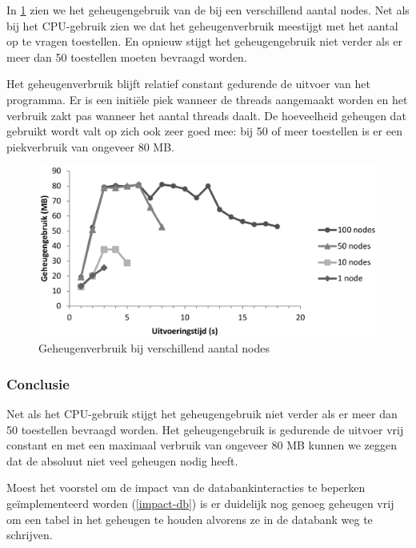 In \cref{fig-ram-aantalnodes} zien we het geheugengebruik van de \nwmretriever{} bij een verschillend aantal nodes.
Net als bij het CPU-gebruik zien we dat het geheugenverbruik meestijgt met het aantal op te vragen toestellen.
En opnieuw stijgt het geheugengebruik niet verder als er meer dan 50 toestellen moeten bevraagd worden.

Het geheugenverbruik blijft relatief constant gedurende de uitvoer van het programma.
Er is een initiële piek wanneer de threads aangemaakt worden en het verbruik zakt pas wanneer het aantal threads daalt.
De hoeveelheid geheugen dat gebruikt wordt valt op zich ook zeer goed mee: bij 50 of meer toestellen is er een piekverbruik van ongeveer 80 MB.

\begin{figure}[h]
	\centering
	\includegraphics[scale=0.40]{figures/ram-100nodes}
	\caption{Geheugenverbruik bij verschillend aantal nodes}
	\label{fig-ram-aantalnodes}
\end{figure}

\subsubsection{Conclusie}

Net als het CPU-gebruik stijgt het geheugengebruik niet verder als er meer dan 50 toestellen bevraagd worden.
Het geheugengebruik is gedurende de uitvoer vrij constant en met een maximaal verbruik van ongeveer 80 MB kunnen we zeggen dat
de \nwmretriever{} absoluut niet veel geheugen nodig heeft.

Moest het voorstel om de impact van de databankinteracties te beperken geïmplementeerd worden (\cref{impact-db}) is er duidelijk
nog genoeg geheugen vrij om een tabel in het geheugen te houden alvorens ze in de databank weg te schrijven. 


